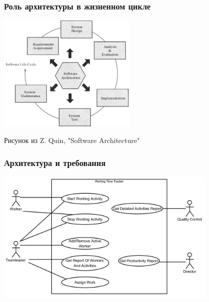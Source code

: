\documentclass{../slides-style}
\begin{document}
    \begin{frame}
        \frametitle{Роль архитектуры в жизненном цикле}
        \begin{center}
            \includegraphics[width=0.5\textwidth]{architectureLifeCycle.png}

            \begin{tiny}
                Рисунок из Z. Quin, "Software Architecture"
            \end{tiny}
        \end{center}
    \end{frame}

    \begin{frame}
        \frametitle{Архитектура и требования}
        \begin{center}
            \includegraphics[width=0.8\textwidth]{useCaseDiagram.png}
        \end{center}
    \end{frame}
\end{document}
